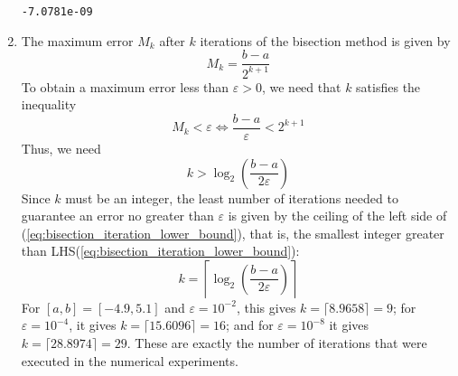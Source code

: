 \documentclass{homework}
\begin{document}
\begin{alphaparts}
\begin{enumerate}[label=\textbf{(\arabic*)}]
\begin{lstlisting}[basicstyle=\small\ttfamily, frame=single]
  -7.0781e-09
		\end{lstlisting}
		\item The maximum error $M_k$ after $k$ iterations of the bisection method is given by \begin{equation}
			M_k = \frac{b-a}{2^{k+1}}
		\end{equation}
		To obtain a maximum error less than $\varepsilon > 0$, we need that $k$ satisfies the inequality
		\begin{equation}
			M_k < \varepsilon \iff \frac{b-a}{\varepsilon} < 2^{k+1}
		\end{equation}
		Thus, we need
		\begin{equation}
			\label{eq:bisection_iteration_lower_bound}
			k > \log_2\left(\frac{b-a}{2\varepsilon}\right)
		\end{equation}
		Since $k$ must be an integer, the least number of iterations needed to guarantee an error no greater than $\varepsilon$ is given by the ceiling of the left side of (\ref{eq:bisection_iteration_lower_bound}), that is, the smallest integer greater than LHS(\ref{eq:bisection_iteration_lower_bound}):
		\begin{equation}
			k = \left\lceil \log_2\left(\frac{b-a}{2\varepsilon}\right) \right\rceil
		\end{equation}
		For $[a,b] = [-4.9,5.1]$ and $\varepsilon = 10^{-2}$, this gives $k = \lceil 8.9658 \rceil = 9$; for $\varepsilon = 10^{-4}$, it gives $k = \lceil 15.6096\rceil = 16$; and for $\varepsilon = 10^{-8}$ it gives $k=\lceil 28.8974\rceil = 29$. These are exactly the number of iterations that were executed in the numerical experiments.
	\end{enumerate}
	
\end{alphaparts}

\question
\end{document}
